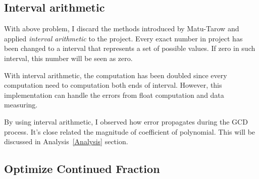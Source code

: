\subsection{Interval arithmetic}

With above problem, I discard the methods introduced by
Matu-Tarow\cite{Approximate} and applied \textit{interval arithmetic} to the
project. Every exact number in project has been changed to a interval that
represents a set of possible values. If zero in such interval, this number will
be seen as zero.

With interval arithmetic, the computation has been doubled since every
computation need to computation both ends of interval. However, this
implementation can handle the errors from float computation and data measuring.

By using interval arithmetic, I observed how error propagates during the GCD
process. It's close related the magnitude of coefficient of polynomial. This
will be discussed in Analysis~\ref{Analysis} section. 

\subsection{Optimize Continued Fraction}


